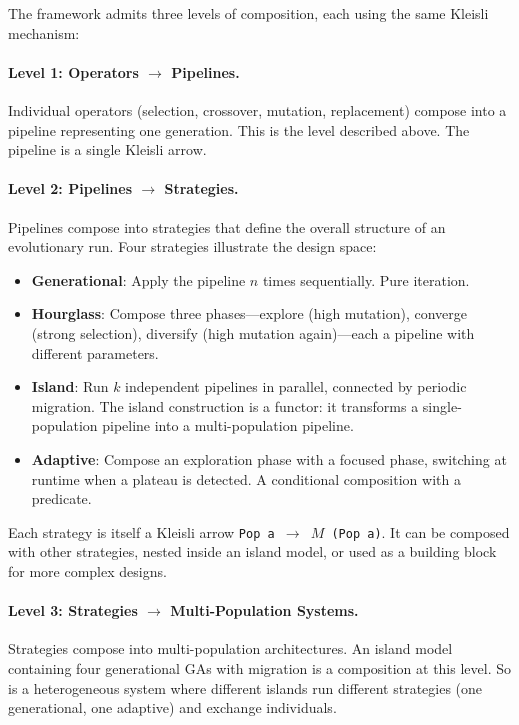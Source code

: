 \documentclass[dvipsnames,format=sigconf,anonymous=false,review=false]{acmart}
\begin{document}
The framework admits three levels of composition, each using the same Kleisli mechanism:

\paragraph{Level 1: Operators $\to$ Pipelines.}
Individual operators (selection, crossover, mutation, replacement) compose into a pipeline representing one generation. This is the level described above. The pipeline is a single Kleisli arrow.

\paragraph{Level 2: Pipelines $\to$ Strategies.}
Pipelines compose into strategies that define the overall structure of an evolutionary run. Four strategies illustrate the design space:

\begin{itemize}[nosep]
  \item \textbf{Generational}: Apply the pipeline $n$ times sequentially. Pure iteration.
  \item \textbf{Hourglass}: Compose three phases---explore (high mutation), converge (strong selection), diversify (high mutation again)---each a pipeline with different parameters.
  \item \textbf{Island}: Run $k$ independent pipelines in parallel, connected by periodic migration. The island construction is a functor: it transforms a single-population pipeline into a multi-population pipeline.
  \item \textbf{Adaptive}: Compose an exploration phase with a focused phase, switching at runtime when a plateau is detected. A conditional composition with a predicate.
\end{itemize}

\noindent Each strategy is itself a Kleisli arrow \texttt{Pop\,a $\to$ $M$\,(Pop\,a)}. It can be composed with other strategies, nested inside an island model, or used as a building block for more complex designs.

\paragraph{Level 3: Strategies $\to$ Multi-Population Systems.}
Strategies compose into multi-population architectures. An island model containing four generational GAs with migration is a composition at this level. So is a heterogeneous system where different islands run different strategies (one generational, one adaptive) and exchange individuals.
\end{document}
